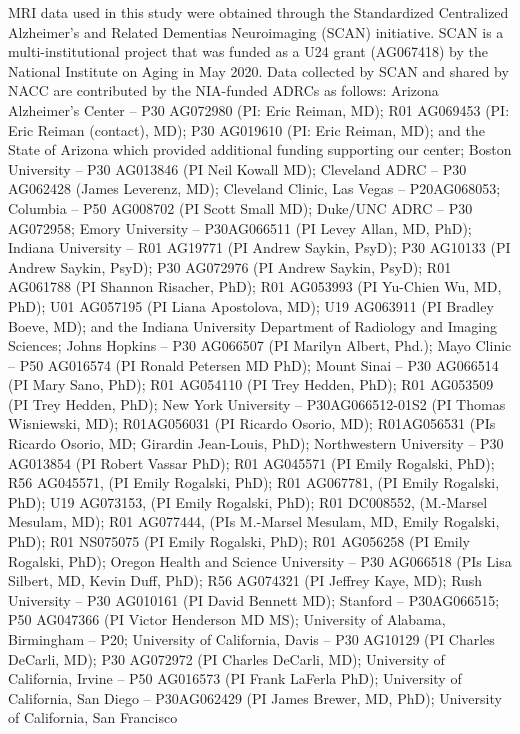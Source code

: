 \documentclass[11pt,a4paper]{article}
\begin{document}
\noindent MRI data used in this study were obtained through the Standardized
Centralized Alzheimer's and Related Dementias Neuroimaging (SCAN) initiative.
SCAN is a multi-institutional project that was funded as a U24 grant
(AG067418) by the National Institute on Aging in May 2020. Data collected by
SCAN and shared by NACC are contributed by the NIA-funded ADRCs as follows:
Arizona Alzheimer's Center -- P30 AG072980 (PI: Eric Reiman, MD); R01 AG069453
(PI: Eric Reiman (contact), MD); P30 AG019610 (PI: Eric Reiman, MD); and the
State of Arizona which provided additional funding supporting our center;
Boston University -- P30 AG013846 (PI Neil Kowall MD); Cleveland ADRC --
P30 AG062428 (James Leverenz, MD); Cleveland Clinic, Las Vegas -- P20AG068053;
Columbia -- P50 AG008702 (PI Scott Small MD); Duke/UNC ADRC -- P30 AG072958;
Emory University -- P30AG066511 (PI Levey Allan, MD, PhD); Indiana University --
R01 AG19771 (PI Andrew Saykin, PsyD); P30 AG10133 (PI Andrew Saykin, PsyD);
P30 AG072976 (PI Andrew Saykin, PsyD); R01 AG061788 (PI Shannon Risacher, PhD);
R01 AG053993 (PI Yu-Chien Wu, MD, PhD); U01 AG057195 (PI Liana Apostolova, MD);
U19 AG063911 (PI Bradley Boeve, MD); and the Indiana University Department of
Radiology and Imaging Sciences; Johns Hopkins -- P30 AG066507 (PI Marilyn
Albert, Phd.); Mayo Clinic -- P50 AG016574 (PI Ronald Petersen MD PhD);
Mount Sinai -- P30 AG066514 (PI Mary Sano, PhD); R01 AG054110 (PI Trey Hedden,
PhD); R01 AG053509 (PI Trey Hedden, PhD); New York University --
P30AG066512-01S2 (PI Thomas Wisniewski, MD); R01AG056031 (PI Ricardo Osorio,
MD); R01AG056531 (PIs Ricardo Osorio, MD; Girardin Jean-Louis, PhD);
Northwestern University -- P30 AG013854 (PI Robert Vassar PhD); R01 AG045571
(PI Emily Rogalski, PhD); R56 AG045571, (PI Emily Rogalski, PhD); R01 AG067781,
(PI Emily Rogalski, PhD); U19 AG073153, (PI Emily Rogalski, PhD); R01 DC008552,
(M.-Marsel Mesulam, MD); R01 AG077444, (PIs M.-Marsel Mesulam, MD, Emily
Rogalski, PhD); R01 NS075075 (PI Emily Rogalski, PhD); R01 AG056258 (PI Emily
Rogalski, PhD); Oregon Health and Science University -- P30 AG066518 (PIs Lisa
Silbert, MD, Kevin Duff, PhD); R56 AG074321 (PI Jeffrey Kaye, MD); Rush
University -- P30 AG010161 (PI David Bennett MD); Stanford -- P30AG066515;
P50 AG047366 (PI Victor Henderson MD MS); University of Alabama, Birmingham --
P20; University of California, Davis -- P30 AG10129 (PI Charles DeCarli, MD);
P30 AG072972 (PI Charles DeCarli, MD); University of California, Irvine --
P50 AG016573 (PI Frank LaFerla PhD); University of California, San Diego --
P30AG062429 (PI James Brewer, MD, PhD); University of California, San Francisco
\end{document}
